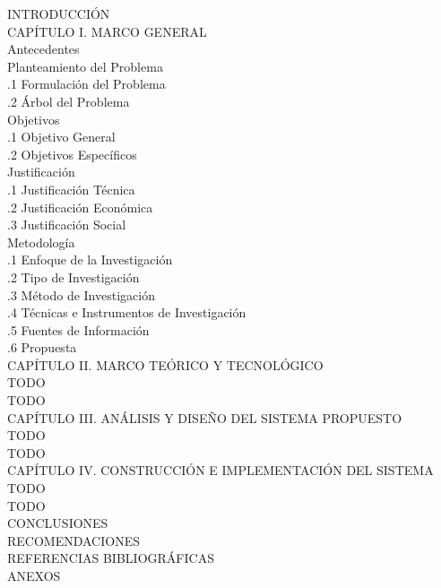 \documentclass{univalle-perfil}
\begin{document}
\begin{indicetentativo}
INTRODUCCIÓN \\[2pt]
CAPÍTULO I. MARCO GENERAL \\
 Antecedentes \\
 Planteamiento del Problema \\
\quad{}.1 Formulación del Problema \\
\quad{}.2 Árbol del Problema \\
 Objetivos \\
\quad{}.1 Objetivo General \\
\quad{}.2 Objetivos Específicos \\
 Justificación \\
\quad{}.1 Justificación Técnica \\
\quad{}.2 Justificación Económica \\
\quad{}.3 Justificación Social \\
 Metodología \\
\quad{}.1 Enfoque de la Investigación \\
\quad{}.2 Tipo de Investigación \\
\quad{}.3 Método de Investigación \\
\quad{}.4 Técnicas e Instrumentos de Investigación \\
\quad{}.5 Fuentes de Información \\
\quad{}.6 Propuesta \\[2pt]
CAPÍTULO II. MARCO TEÓRICO Y TECNOLÓGICO \\
 TODO \\
 TODO \\[2pt]
CAPÍTULO III. ANÁLISIS Y DISEÑO DEL SISTEMA PROPUESTO \\
 TODO \\
 TODO \\[2pt]
CAPÍTULO IV. CONSTRUCCIÓN E IMPLEMENTACIÓN DEL SISTEMA \\
 TODO \\
 TODO \\[2pt]
CONCLUSIONES \\
RECOMENDACIONES \\
REFERENCIAS BIBLIOGRÁFICAS \\
ANEXOS
\end{indicetentativo}

\end{document}
